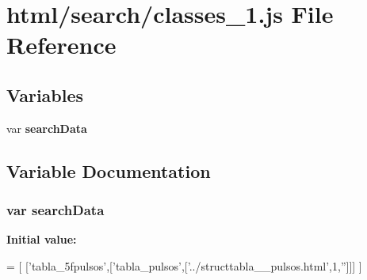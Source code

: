 \section{html/search/classes\+\_\+1.js File Reference}
\label{classes__1_8js}
\subsection*{Variables}
\begin{DoxyCompactItemize}
\item 
var {\bf search\+Data}
\end{DoxyCompactItemize}


\subsection{Variable Documentation}
\subsubsection[{search\+Data}]{\setlength{\rightskip}{0pt plus 5cm}var search\+Data}\label{classes__1_8js_ad01a7523f103d6242ef9b0451861231e}
{\bfseries Initial value\+:}
\begin{DoxyCode}
=
[
  [\textcolor{stringliteral}{'tabla\_5fpulsos'},[\textcolor{stringliteral}{'tabla\_pulsos'},[\textcolor{stringliteral}{'../structtabla\_\_pulsos.html'},1,\textcolor{stringliteral}{''}]]]
]
\end{DoxyCode}
